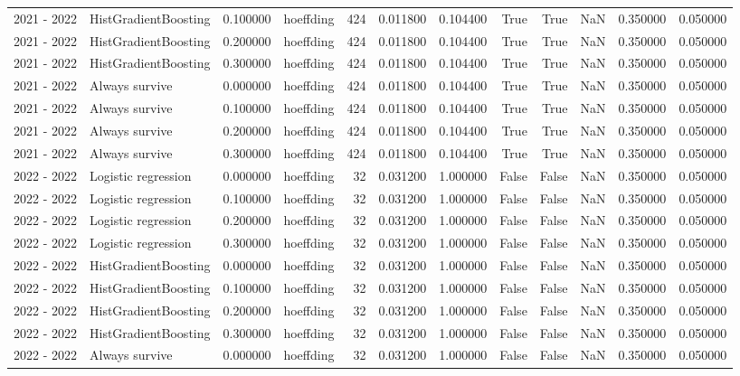 \begin{tabular}{llrlrrrrrrrr}
2021 - 2022 & HistGradientBoosting & 0.100000 & hoeffding & 424 & 0.011800 & 0.104400 & True & True & NaN & 0.350000 & 0.050000 \\
2021 - 2022 & HistGradientBoosting & 0.200000 & hoeffding & 424 & 0.011800 & 0.104400 & True & True & NaN & 0.350000 & 0.050000 \\
2021 - 2022 & HistGradientBoosting & 0.300000 & hoeffding & 424 & 0.011800 & 0.104400 & True & True & NaN & 0.350000 & 0.050000 \\
2021 - 2022 & Always survive & 0.000000 & hoeffding & 424 & 0.011800 & 0.104400 & True & True & NaN & 0.350000 & 0.050000 \\
2021 - 2022 & Always survive & 0.100000 & hoeffding & 424 & 0.011800 & 0.104400 & True & True & NaN & 0.350000 & 0.050000 \\
2021 - 2022 & Always survive & 0.200000 & hoeffding & 424 & 0.011800 & 0.104400 & True & True & NaN & 0.350000 & 0.050000 \\
2021 - 2022 & Always survive & 0.300000 & hoeffding & 424 & 0.011800 & 0.104400 & True & True & NaN & 0.350000 & 0.050000 \\
2022 - 2022 & Logistic regression & 0.000000 & hoeffding & 32 & 0.031200 & 1.000000 & False & False & NaN & 0.350000 & 0.050000 \\
2022 - 2022 & Logistic regression & 0.100000 & hoeffding & 32 & 0.031200 & 1.000000 & False & False & NaN & 0.350000 & 0.050000 \\
2022 - 2022 & Logistic regression & 0.200000 & hoeffding & 32 & 0.031200 & 1.000000 & False & False & NaN & 0.350000 & 0.050000 \\
2022 - 2022 & Logistic regression & 0.300000 & hoeffding & 32 & 0.031200 & 1.000000 & False & False & NaN & 0.350000 & 0.050000 \\
2022 - 2022 & HistGradientBoosting & 0.000000 & hoeffding & 32 & 0.031200 & 1.000000 & False & False & NaN & 0.350000 & 0.050000 \\
2022 - 2022 & HistGradientBoosting & 0.100000 & hoeffding & 32 & 0.031200 & 1.000000 & False & False & NaN & 0.350000 & 0.050000 \\
2022 - 2022 & HistGradientBoosting & 0.200000 & hoeffding & 32 & 0.031200 & 1.000000 & False & False & NaN & 0.350000 & 0.050000 \\
2022 - 2022 & HistGradientBoosting & 0.300000 & hoeffding & 32 & 0.031200 & 1.000000 & False & False & NaN & 0.350000 & 0.050000 \\
2022 - 2022 & Always survive & 0.000000 & hoeffding & 32 & 0.031200 & 1.000000 & False & False & NaN & 0.350000 & 0.050000 \\

\end{tabular}
